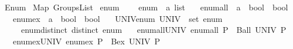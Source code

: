 %
\begin{isabellebody}%
%
%
\isadelimdocument
%
\endisadelimdocument
%
\isatagdocument
%
\isamarkuptrue%
%
\endisatagdocument
{\isafolddocument}%
%
\isadelimdocument
%
\endisadelimdocument
%
\isadelimtheory
%
\endisadelimtheory
%
\isatagtheory
{}\isamarkupfalse%
\ Enum\isanewline
{}\ Map\ Groups{\isacharunderscore}{\kern0pt}List\isanewline
{}%
\endisatagtheory
{\isafoldtheory}%
%
\isadelimtheory
%
\endisadelimtheory
%
\isadelimdocument
%
\endisadelimdocument
%
\isatagdocument
%
\isamarkuptrue%
%
\endisatagdocument
{\isafolddocument}%
%
\isadelimdocument
%
\endisadelimdocument
{}\isamarkupfalse%
\ enum\ {\isacharequal}{\kern0pt}\isanewline
\ \ \ enum\ {\isacharcolon}{\kern0pt}{\isacharcolon}{\kern0pt}\ {\isachardoublequoteopen}{\isacharprime}{\kern0pt}a\ list{\isachardoublequoteclose}\isanewline
\ \ \ enum{\isacharunderscore}{\kern0pt}all\ {\isacharcolon}{\kern0pt}{\isacharcolon}{\kern0pt}\ {\isachardoublequoteopen}{\isacharparenleft}{\kern0pt}{\isacharprime}{\kern0pt}a\ {\isasymRightarrow}\ bool{\isacharparenright}{\kern0pt}\ {\isasymRightarrow}\ bool{\isachardoublequoteclose}\isanewline
\ \ \ enum{\isacharunderscore}{\kern0pt}ex\ {\isacharcolon}{\kern0pt}{\isacharcolon}{\kern0pt}\ {\isachardoublequoteopen}{\isacharparenleft}{\kern0pt}{\isacharprime}{\kern0pt}a\ {\isasymRightarrow}\ bool{\isacharparenright}{\kern0pt}\ {\isasymRightarrow}\ bool{\isachardoublequoteclose}\isanewline
\ \ \ UNIV{\isacharunderscore}{\kern0pt}enum{\isacharcolon}{\kern0pt}\ {\isachardoublequoteopen}UNIV\ {\isacharequal}{\kern0pt}\ set\ enum{\isachardoublequoteclose}\isanewline
\ \ \ \ \ enum{\isacharunderscore}{\kern0pt}distinct{\isacharcolon}{\kern0pt}\ {\isachardoublequoteopen}distinct\ enum{\isachardoublequoteclose}\isanewline
\ \ \ enum{\isacharunderscore}{\kern0pt}all{\isacharunderscore}{\kern0pt}UNIV{\isacharcolon}{\kern0pt}\ {\isachardoublequoteopen}enum{\isacharunderscore}{\kern0pt}all\ P\ {\isasymlongleftrightarrow}\ Ball\ UNIV\ P{\isachardoublequoteclose}\isanewline
\ \ \ enum{\isacharunderscore}{\kern0pt}ex{\isacharunderscore}{\kern0pt}UNIV{\isacharcolon}{\kern0pt}\ {\isachardoublequoteopen}enum{\isacharunderscore}{\kern0pt}ex\ P\ {\isasymlongleftrightarrow}\ Bex\ UNIV\ P{\isachardoublequoteclose}\ \isanewline
\ \ \ %

\end{isabellebody}
